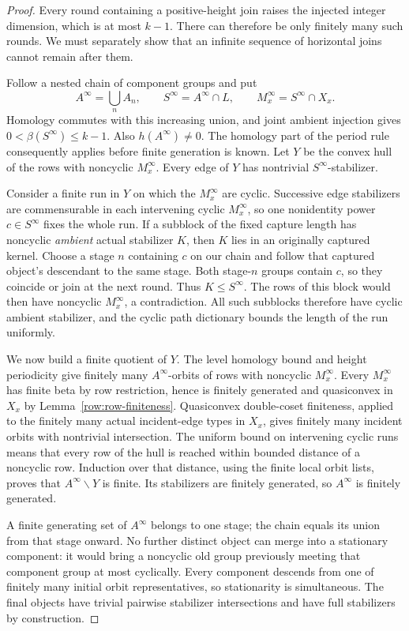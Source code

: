 \begin{proof}
Every round containing a positive-height join raises the injected
integer dimension, which is at most $k-1$. There can therefore be
only finitely many such rounds. We must separately show that an
infinite sequence of horizontal joins cannot remain after them.

Follow a nested chain of component groups and put
\[
 A^\infty=\bigcup_n A_n,\qquad
 S^\infty=A^\infty\cap L,\qquad
 M_x^\infty=S^\infty\cap X_x.
\]
Homology commutes with this increasing union, and joint ambient
injection gives $0<\beta(S^\infty)\le k-1$. Also $h(A^\infty)\ne0$.
The homology part of the period rule consequently applies before
finite generation is known. Let $Y$ be the convex hull of the rows
with noncyclic $M_x^\infty$. Every edge of $Y$ has nontrivial
$S^\infty$-stabilizer.

Consider a finite run in $Y$ on which the $M_x^\infty$ are cyclic.
Successive edge stabilizers are commensurable in each intervening
cyclic $M_x^\infty$, so one nonidentity power $c\in S^\infty$
fixes the whole run. If a subblock of the fixed capture length has
noncyclic \emph{ambient} actual stabilizer $K$, then $K$ lies in an
originally captured kernel. Choose a stage $n$ containing $c$ on
our chain and follow that captured object's descendant to the same
stage. Both stage-$n$ groups contain $c$, so they coincide or join
at the next round. Thus $K\le S^\infty$. The rows of this block
would then have noncyclic $M_x^\infty$, a contradiction. All such
subblocks therefore have cyclic ambient stabilizer, and the cyclic
path dictionary bounds the length of the run uniformly.

We now build a finite quotient of $Y$. The level homology bound and
height periodicity give finitely many $A^\infty$-orbits of rows with
noncyclic $M_x^\infty$. Every $M_x^\infty$ has finite beta by row
restriction, hence is finitely generated and quasiconvex in $X_x$
by Lemma~\ref{row:row-finiteness}. Quasiconvex double-coset finiteness,
applied to the finitely many actual incident-edge types in $X_x$,
gives finitely many incident orbits with nontrivial intersection.
The uniform bound on intervening cyclic runs means that every row
of the hull is reached within bounded distance of a noncyclic row.
Induction over that distance, using the finite local orbit lists,
proves that $A^\infty\backslash Y$ is finite. Its stabilizers are
finitely generated, so $A^\infty$ is finitely generated.

A finite generating set of $A^\infty$ belongs to one stage; the
chain equals its union from that stage onward. No further distinct
object can merge into a stationary component: it would bring a
noncyclic old group previously meeting that component group at most
cyclically. Every component descends from one of finitely many
initial orbit representatives, so stationarity is simultaneous.
The final objects have trivial pairwise stabilizer intersections and
have full stabilizers by construction.


\end{proof}
